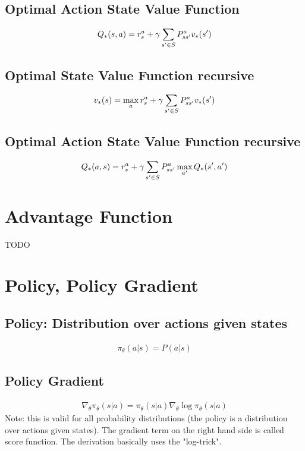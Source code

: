 \subsection{Optimal Action State Value Function}
\begin{align}
	Q_{*}(s, a) = r_s^a + \gamma \sum_{s' \in S} P_{ss'}^a v_{*} (s')
\end{align}
\subsection{Optimal State Value Function recursive}
\begin{align}
	v_{*} (s) = \max\limits_a r_s^a + \gamma \sum_{s' \in S} P_{ss'}^a v_{*} (s')
\end{align}
\subsection{Optimal Action State Value Function recursive}
\begin{align}
	Q_{*}(a, s) = r_s^a + \gamma \sum_{s' \in S} P_{ss'}^a \max\limits_{a'} Q_{*}(s', a')
\end{align}


\section{Advantage Function}

TODO


\section{Policy, Policy Gradient}

\subsection{Policy: Distribution over actions given states}
\renewcommand{\policy}[2]{\pi_\theta (#1 | #2)}
\begin{align}
	\policy{a}{s} = P(a | s)
\end{align}
\subsection{Policy Gradient}
\begin{align}
	\nabla_\theta \policy{s}{a} = \policy{s}{a} \nabla_\theta \log \policy{s}{a}
\end{align}
Note: this is valid for all probability distributions (the policy is a distribution over actions given states). The gradient term on the right hand side is called score function. The derivation basically uses the "log-trick".


